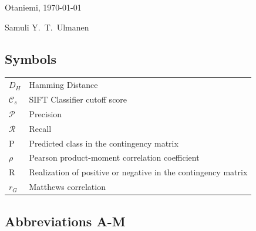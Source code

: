 \documentclass[english,12pt,a4paper,pdftex,elec,utf8, table]{aaltothesis}
\begin{document}
\vspace{5cm}
Otaniemi, \today

\vspace{5mm}
{\hfill Samuli Y.\ T.\ Ulmanen \hspace{1cm}}

\newpage


\thesistableofcontents


\subsection*{Symbols}

\begin{tabular}{ll}
$D_H$ & Hamming Distance\\
$\mathcal{C}_s$ & SIFT Classifier cutoff score\\
  $\mathcal{P}$ & Precision\\
  $\mathcal{R}$ & Recall\\
  P & Predicted class in the contingency matrix\\
  $\rho$ & Pearson product-moment correlation coefficient\\
  R & Realization of positive or negative in the contingency matrix\\
  $r_G$ & Matthews correlation\\
\end{tabular}

\subsection*{Abbreviations A-M}
\end{document}
